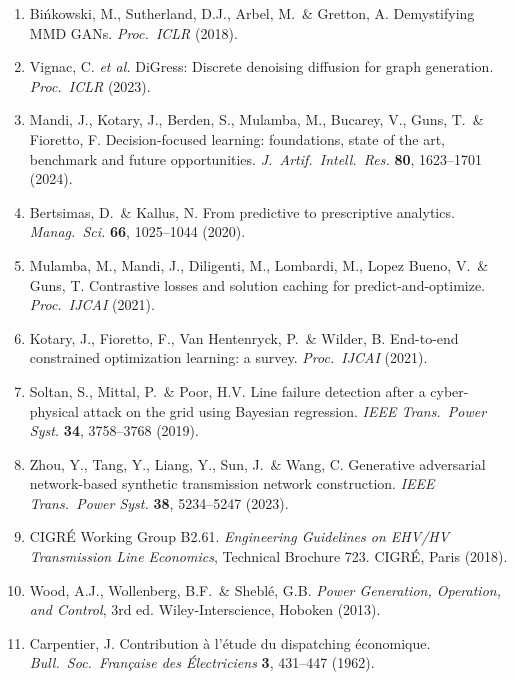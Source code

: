\documentclass[10pt,a4paper]{article}
\begin{document}
\begin{enumerate}[label={\arabic*.}, leftmargin=*, itemsep=2pt, topsep=2pt]
\item Bi\'nkowski, M., Sutherland, D.J., Arbel, M.\ \& Gretton, A.
Demystifying MMD GANs. \emph{Proc.\ ICLR} (2018).

\item Vignac, C. \emph{et al.} DiGress: Discrete denoising
diffusion for graph generation. \emph{Proc.\ ICLR} (2023).

\item Mandi, J., Kotary, J., Berden, S., Mulamba, M., Bucarey, V.,
Guns, T.\ \& Fioretto, F. Decision-focused learning: foundations,
state of the art, benchmark and future opportunities.
\emph{J.\ Artif.\ Intell.\ Res.} \textbf{80}, 1623--1701 (2024).

\item Bertsimas, D.\ \& Kallus, N. From predictive to prescriptive
analytics. \emph{Manag.\ Sci.} \textbf{66}, 1025--1044 (2020).

\item Mulamba, M., Mandi, J., Diligenti, M., Lombardi, M.,
Lopez Bueno, V.\ \& Guns, T. Contrastive losses and solution
caching for predict-and-optimize. \emph{Proc.\ IJCAI} (2021).

\item Kotary, J., Fioretto, F., Van Hentenryck, P.\ \& Wilder, B.
End-to-end constrained optimization learning: a survey.
\emph{Proc.\ IJCAI} (2021).

\item Soltan, S., Mittal, P.\ \& Poor, H.V. Line failure
detection after a cyber-physical attack on the grid using
Bayesian regression. \emph{IEEE Trans.\ Power Syst.}
\textbf{34}, 3758--3768 (2019).

\item Zhou, Y., Tang, Y., Liang, Y., Sun, J.\ \& Wang, C.
Generative adversarial network-based synthetic transmission
network construction. \emph{IEEE Trans.\ Power Syst.}
\textbf{38}, 5234--5247 (2023).

\item CIGR\'E Working Group B2.61. \emph{Engineering Guidelines on
EHV/HV Transmission Line Economics}, Technical Brochure 723.
CIGR\'E, Paris (2018).

\item Wood, A.J., Wollenberg, B.F.\ \& Shebl\'e, G.B. \emph{Power
Generation, Operation, and Control}, 3rd ed. Wiley-Interscience,
Hoboken (2013).

\item Carpentier, J. Contribution \`a l'\'etude du dispatching
\'economique. \emph{Bull.\ Soc.\ Fran\c{c}aise des \'Electriciens}
\textbf{3}, 431--447 (1962).


\end{enumerate}
\end{document}
